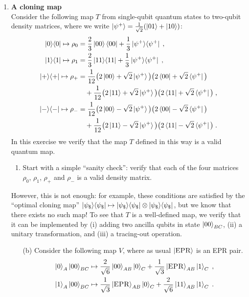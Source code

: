 \documentclass[12pt]{article}
\begin{document}
\begin{enumerate}
\item {\bf A cloning map}\label{ex:2-qmamp}\\
Consider the following map $T$ from single-qubit quantum states to two-qubit density matrices, where we write $\ket{\psi^+} = \frac{1}{\sqrt{2}}(\ket{01}+\ket{10})$:
\begin{align*}
\ket{0}\!\bra{0} \mapsto \rho_0 &= \frac{2}{3} \ket{00}\bra{00} + \frac{1}{3} \ket{\psi^+}\!\bra{\psi^+} \;,\\
\ket{1}\!\bra{1} \mapsto \rho_1 &= \frac{2}{3} \ket{11}\!\bra{11} + \frac{1}{3} \ket{\psi^+}\!\bra{\psi^+} \;,\\
\ket{+}\!\bra{+} \mapsto \rho_+ &= \frac{1}{12} \big( 2\ket{00}+ \sqrt{2}\ket{\psi^+} \big)\big( 2\bra{00}+ \sqrt{2}\bra{\psi^+} \big) \\
&\quad+ \frac{1}{12} \big( 2\ket{11}+ \sqrt{2}\ket{\psi^+} \big)\big( 2\bra{11}+\sqrt{2} \bra{\psi^+} \big)\;,\\
\ket{-}\!\bra{-} \mapsto \rho_- &= \frac{1}{12} \big( 2\ket{00}-\sqrt{2}\ket{\psi^+} \big)\big( 2\bra{00}- \sqrt{2}\bra{\psi^+} \big) \\
&\quad+ \frac{1}{12} \big( 2\ket{11}- \sqrt{2}\ket{\psi^+} \big)\big( 2\bra{11}-\sqrt{2} \bra{\psi^+} \big)\;.
\end{align*}
In this exercise we verify that the map $T$ defined in this way is a valid quantum map. 
\begin{enumerate}
\item Start with a simple ``sanity check'': verify that each of the four matrices $\rho_0$, $\rho_1$, $\rho_+$ and $\rho_-$ is a valid density matrix. 
\end{enumerate}
However, this is not enough: for example, these conditions are satisfied by the ``optimal cloning map'' $\ket{\psi_\$}\!\bra{\psi_\$}\mapsto \ket{\psi_\$}\!\bra{\psi_\$}\otimes \ket{\psi_\$}\!\bra{\psi_\$}$, but we know that there exists no such map! To see that $T$ is a well-defined map, we verify that it can be implemented by (i) adding two ancilla qubits in state $\ket{00}_{BC}$, (ii) a unitary transformation, and (iii) a tracing-out operation. 
\begin{enumerate}
\item[(b)] Consider the following map $V$, where as usual $\ket{\textsc{EPR}}$ is an EPR pair.  
\begin{align*}
\ket{0}_A \ket{00}_{BC} \mapsto \frac{2}{\sqrt{6}}\ket{00}_{AB}\ket{0}_C + \frac{1}{\sqrt{3}} \ket{\textsc{EPR}}_{AB} \ket{1}_C \;,\\
\ket{1}_A \ket{00}_{BC} \mapsto  \frac{1}{\sqrt{3}} \ket{\textsc{EPR}}_{AB}\ket{0}_C + \frac{2}{\sqrt{6}}\ket{11}_{AB}\ket{1}_C \;.
\end{align*}

\end{enumerate}
\end{enumerate}
\end{document}
